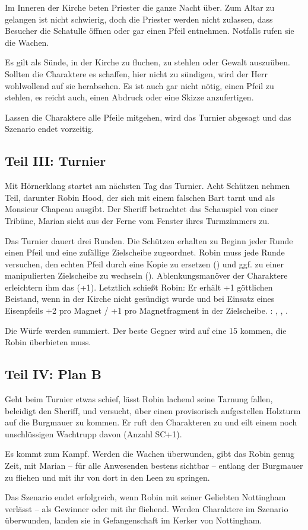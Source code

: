 {		Im Inneren der Kirche beten Priester die ganze Nacht über. Zum Altar zu gelangen ist nicht schwierig, doch die Priester werden nicht zulassen, dass Besucher die Schatulle öffnen oder gar einen Pfeil entnehmen. Notfalls rufen sie die Wachen.

		Es gilt als Sünde, in der Kirche zu fluchen, zu stehlen oder Gewalt auszuüben. Sollten die Charaktere es schaffen, hier nicht zu sündigen, wird der Herr wohlwollend auf sie herabsehen. Es ist auch gar nicht nötig, einen Pfeil zu stehlen, es reicht auch, einen Abdruck oder eine Skizze anzufertigen.

		Lassen die Charaktere alle Pfeile mitgehen, wird das Turnier abgesagt und das Szenario endet vorzeitig.

		\subsection{Teil III: Turnier}

		Mit Hörnerklang startet am nächsten Tag das Turnier. Acht Schützen nehmen Teil, darunter Robin Hood, der sich mit einem falschen Bart tarnt und als Monsieur Chapeau ausgibt. Der Sheriff betrachtet das Schauspiel von einer Tribüne, Marian sieht aus der Ferne vom Fenster ihres Turmzimmers zu.

		Das Turnier dauert drei Runden. Die Schützen erhalten zu Beginn jeder Runde einen Pfeil und eine zufällige Zielscheibe zugeordnet. Robin muss jede Runde versuchen, den echten Pfeil durch eine Kopie zu ersetzen () und ggf. zu einer manipulierten Zielscheibe zu wechseln (). Ablenkungsmanöver der Charaktere erleichtern ihm das (+1). Letztlich schießt Robin: Er erhält +1 göttlichen Beistand, wenn in der Kirche nicht gesündigt wurde und bei Einsatz eines Eisenpfeils +2 pro Magnet / +1 pro Magnetfragment in der Zielscheibe. : , , .

		Die Würfe werden summiert. Der beste Gegner wird auf eine 15 kommen, die Robin überbieten muss.

		\subsection{Teil IV: Plan B}

		Geht beim Turnier etwas schief, lässt Robin lachend seine Tarnung fallen, beleidigt den Sheriff, und versucht, über einen provisorisch aufgestellen Holzturm auf die Burgmauer zu kommen. Er ruft den Charakteren  zu und eilt einem noch unschlüssigen Wachtrupp davon (Anzahl SC+1).

		Es kommt zum Kampf. Werden die Wachen überwunden, gibt das Robin genug Zeit, mit Marian -- für alle Anwesenden bestens sichtbar -- entlang der Burgmauer zu fliehen und mit ihr von dort in den Leen zu springen.


		\noindent
		Das Szenario endet erfolgreich, wenn Robin mit seiner Geliebten Nottingham verlässt -- als Gewinner oder mit ihr fliehend. Werden Charaktere im Szenario überwunden, landen sie in Gefangenschaft im Kerker von Nottingham.
}
